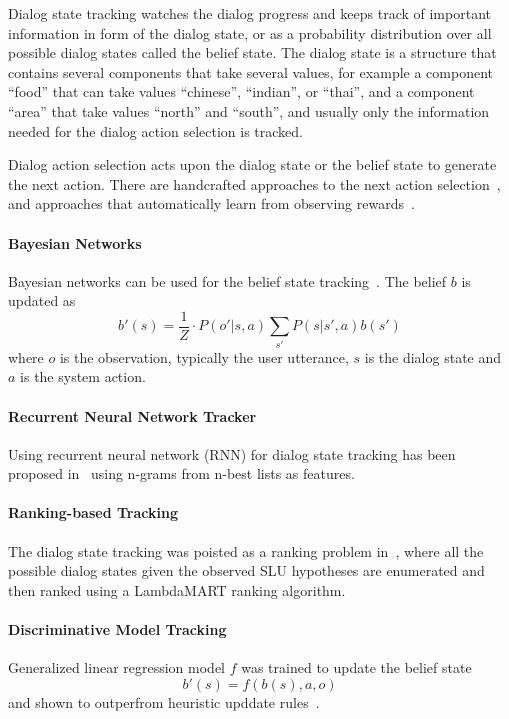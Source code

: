 \documentclass[11pt,twocolumn]{article}
\begin{document}
Dialog state tracking watches the dialog progress and keeps track of important information in form of the dialog state, or as a probability distribution over all possible dialog states called the belief state. The dialog state is a structure that contains several components that take several values, for example a component ``food'' that can take values ``chinese'', ``indian'', or ``thai'', and a component ``area'' that take values ``north'' and ``south'', and usually only the information needed for the dialog action selection is tracked.

Dialog action selection acts upon the dialog state or the belief state to generate the next action. There are handcrafted approaches to the next action selection~\cite{pieraccini2005we,skantze2008galatea}, and approaches that automatically learn from observing rewards~\cite{levin2000stochastic,walker2000application,lemon2006isu,thomson2010bayesian}.

\paragraph*{Bayesian Networks}
Bayesian networks can be used for the belief state tracking~\cite{pulman1996conversational,williams2007applying,bui2006tractable,thomson2010bayesian}. The belief $b$ is updated as
$$b'(s)=\frac{1}{Z} \cdot P(o'|s,a)\sum_{s'}P(s|s',a)b(s')$$
where $o$ is the observation, typically the user utterance, $s$ is the dialog state and $a$ is the system action.

\paragraph*{Recurrent Neural Network Tracker}
Using recurrent neural network (RNN) for dialog state tracking has been proposed in~\cite{henderson2014word,henderson2013deep} using n-grams from n-best lists as features.

\paragraph*{Ranking-based Tracking}
The dialog state tracking was poisted as a ranking problem in~\cite{williams2014web}, where all the possible dialog states given the observed SLU hypotheses are enumerated and then ranked using a LambdaMART ranking algorithm.

\paragraph*{Discriminative Model Tracking}
Generalized linear regression model $f$ was trained to update the belief state
$$b'(s)=f(b(s), a, o)$$
and shown to outperfrom heuristic upddate rules~\cite{bohus2006k}.
\end{document}
